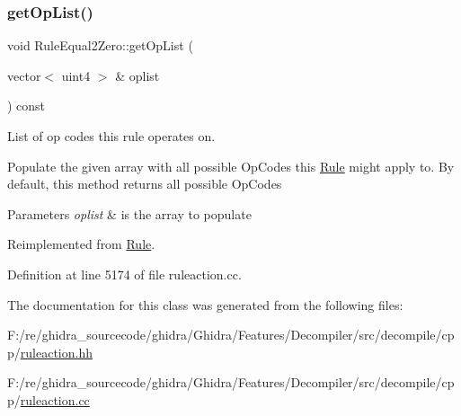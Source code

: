 \subsubsection{\texorpdfstring{getOpList()}{getOpList()}}
{\footnotesize\ttfamily void Rule\+Equal2\+Zero\+::get\+Op\+List (\begin{DoxyParamCaption}\item[{vector$<$ uint4 $>$ \&}]{oplist }\end{DoxyParamCaption}) const\hspace{0.3cm}{\ttfamily [virtual]}}



List of op codes this rule operates on. 

Populate the given array with all possible Op\+Codes this \mbox{\hyperlink{class_rule}{Rule}} might apply to. By default, this method returns all possible Op\+Codes 
\begin{DoxyParams}{Parameters}
{\em oplist} & is the array to populate \\
\hline
\end{DoxyParams}


Reimplemented from \mbox{\hyperlink{class_rule_a4023bfc7825de0ab866790551856d10e}{Rule}}.



Definition at line 5174 of file ruleaction.\+cc.



The documentation for this class was generated from the following files\+:\begin{DoxyCompactItemize}
\item 
F\+:/re/ghidra\+\_\+sourcecode/ghidra/\+Ghidra/\+Features/\+Decompiler/src/decompile/cpp/\mbox{\hyperlink{ruleaction_8hh}{ruleaction.\+hh}}\item 
F\+:/re/ghidra\+\_\+sourcecode/ghidra/\+Ghidra/\+Features/\+Decompiler/src/decompile/cpp/\mbox{\hyperlink{ruleaction_8cc}{ruleaction.\+cc}}\end{DoxyCompactItemize}
